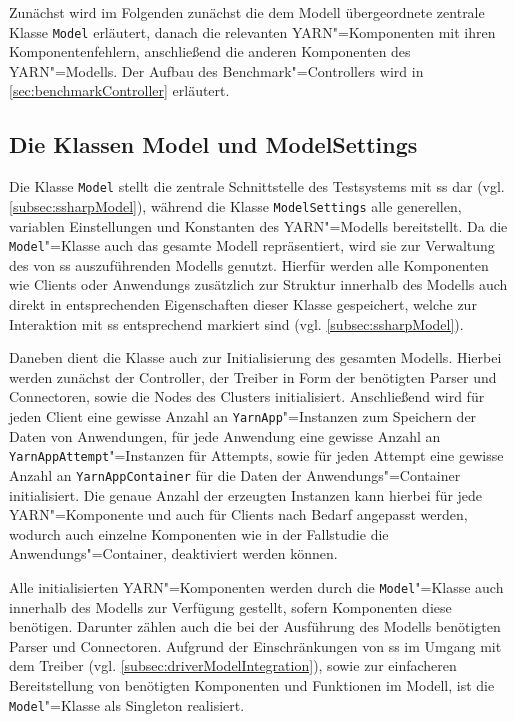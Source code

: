 Zunächst wird im Folgenden zunächst die dem Modell übergeordnete zentrale Klasse \texttt{Model} erläutert, danach die relevanten \gls{YARN}"=Komponenten mit ihren Komponentenfehlern, anschließend die anderen Komponenten des \gls{YARN}"=Modells.
Der Aufbau des Benchmark"=Controllers wird in \cref{sec:benchmarkController} erläutert.

\subsection{Die Klassen Model und ModelSettings}
\label{subsec:modelClass}

Die Klasse \texttt{Model} stellt die zentrale Schnittstelle des Testsystems mit \gls{ss} dar (vgl. \cref{subsec:ssharpModel}), während die Klasse \texttt{ModelSettings} alle generellen, variablen Einstellungen und Konstanten des \gls{YARN}"=Modells bereitstellt.
Da die \texttt{Model}"=Klasse auch das gesamte Modell repräsentiert, wird sie zur Verwaltung des von \gls{ss} auszuführenden Modells genutzt.
Hierfür werden alle Komponenten wie Clients oder \glspl{Anwendung} zusätzlich zur Struktur innerhalb des Modells auch direkt in entsprechenden Eigenschaften dieser Klasse gespeichert, welche zur Interaktion mit \gls{ss} entsprechend markiert sind (vgl. \cref{subsec:ssharpModel}).

Daneben dient die Klasse auch zur Initialisierung des gesamten Modells.
Hierbei werden zunächst der Controller, der Treiber in Form der benötigten Parser und Connectoren, sowie die Nodes des Clusters initialisiert.
Anschließend wird für jeden Client eine gewisse Anzahl an \texttt{YarnApp}"=Instanzen zum Speichern der Daten von Anwendungen, für jede \gls{Anwendung} eine gewisse Anzahl an \texttt{YarnAppAttempt}"=Instanzen für Attempts, sowie für jeden \gls{Attempt} eine gewisse Anzahl an \texttt{YarnAppContainer} für die Daten der Anwendungs"=Container initialisiert.
Die genaue Anzahl der erzeugten Instanzen kann hierbei für jede \gls{YARN}"=Komponente und auch für Clients nach Bedarf angepasst werden, wodurch auch einzelne Komponenten wie \zB in der Fallstudie die Anwendungs"=Container, deaktiviert werden können.

Alle initialisierten \gls{YARN}"=Komponenten werden durch die \texttt{Model}"=Klasse auch innerhalb des Modells zur Verfügung gestellt, sofern Komponenten diese benötigen.
Darunter zählen auch die bei der Ausführung des Modells benötigten Parser und Connectoren.
Aufgrund der Einschränkungen von \gls{ss} im Umgang mit dem Treiber (vgl. \cref{subsec:driverModelIntegration}), sowie zur einfacheren Bereitstellung von benötigten Komponenten und Funktionen im Modell, ist die \texttt{Model}"=Klasse als Singleton realisiert.

